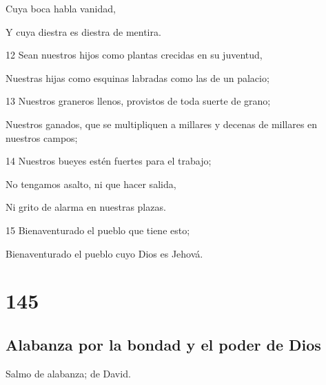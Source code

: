 \par Cuya boca habla vanidad,
\par Y cuya diestra es diestra de mentira.
\par 12 Sean nuestros hijos como plantas crecidas en su juventud,
\par Nuestras hijas como esquinas labradas como las de un palacio;
\par 13 Nuestros graneros llenos, provistos de toda suerte de grano;
\par Nuestros ganados, que se multipliquen a millares y decenas de millares en nuestros campos;
\par 14 Nuestros bueyes estén fuertes para el trabajo;
\par No tengamos asalto, ni que hacer salida,
\par Ni grito de alarma en nuestras plazas.
\par 15 Bienaventurado el pueblo que tiene esto;
\par Bienaventurado el pueblo cuyo Dios es Jehová.

\chapter{145}

\section*{Alabanza por la bondad y el poder de Dios}

\par Salmo de alabanza; de David.

